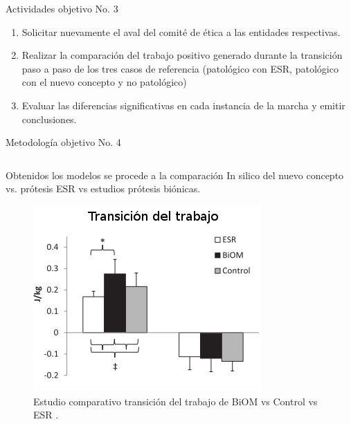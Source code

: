 \documentclass[10pt]{beamer}
\begin{document}
\begin{frame}{Actividades objetivo No. 3}

\begin{enumerate}
\item Solicitar nuevamente el aval del comité de ética a las entidades respectivas.
\item Realizar la comparación del trabajo positivo generado durante la transición
paso a paso de los tres casos de referencia (patológico con ESR, patológico
con el nuevo concepto y no patológico)
\item Evaluar las diferencias significativas en cada instancia de la marcha
y emitir conclusiones.
\end{enumerate}
\end{frame}

\begin{frame}{Metodología objetivo No. 4}

\begin{columns}[t]


\column{65 mm}
\begin{block}{}

{\scriptsize{}Obtenidos los modelos se procede a la comparación In
silico del nuevo concepto vs. prótesis ESR vs estudios prótesis biónicas.}{\scriptsize \par}

\begin{figure}
\begin{centering}
\includegraphics[scale=0.35]{Feathergraphics/Biomvscontrol}
\par\end{centering}
\caption{Estudio comparativo transición del trabajo de BiOM vs Control vs ESR
\cite{Esposito2015}.}

\end{figure}
\end{block}


\end{columns}
\end{frame}
\end{document}
